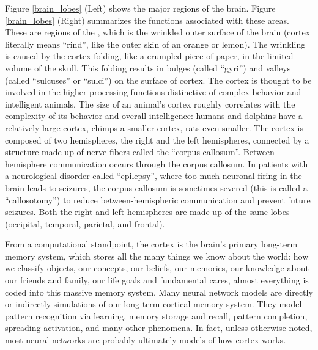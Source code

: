 Figure \ref{brain_lobes} (Left) shows the major regions of the brain. Figure \ref{brain_lobes} (Right) summarizes the functions associated with these areas. These are regions of the , which is the wrinkled outer surface of the brain (cortex literally means ``rind'', like the outer skin of an orange or lemon). The wrinkling is caused by the cortex folding, like a crumpled piece of paper, in the limited volume of the skull. This folding results in bulges (called ``gyri'') and valleys (called  ``sulcuses'' or ``sulci'') on the surface of cortex. The cortex is thought to be involved in the higher processing functions distinctive of complex behavior and intelligent animals. The size of an animal's cortex roughly correlates with the complexity of its behavior and overall intelligence: humans and dolphins have a relatively large cortex, chimps a smaller cortex, rats even smaller. The cortex is composed of two hemispheres, the right and the left hemispheres, connected by a structure made up of nerve fibers called the ``corpus callosum''. Between-hemisphere communication occurs through the corpus callosum. In patients with a neurological disorder called ``epilepsy'', where too much neuronal firing in the brain leads to seizures, the corpus callosum is sometimes severed (this is called a ``callosotomy'') to reduce between-hemispheric communication and prevent future seizures. Both the right and left hemispheres are made up of the same lobes (occipital, temporal, parietal, and frontal).

From a computational standpoint, the cortex is the brain's primary long-term memory system, which stores all the many things we know about the world: how we classify objects, our concepts, our beliefs, our memories, our knowledge about our friends and family, our life goals and fundamental cares, almost everything is coded into this massive memory system. Many neural network models are directly or indirectly simulations of our long-term cortical memory system. They model pattern recognition via learning, memory storage and recall, pattern completion, spreading activation, and many other phenomena. In fact, unless otherwise noted, most neural networks are probably ultimately models of how cortex works.

